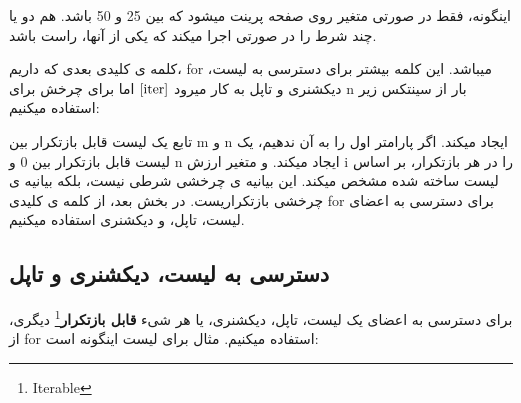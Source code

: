\documentclass[14pt,a4paper]{memoir}
\begin{document}
	 \begin{latin}
	
\end{latin}
	 
	 
	 اینگونه، فقط در صورتی متغیر روی صفحه پرینت میشود که بین 25 و 50 باشد.  هم دو یا چند شرط را در صورتی اجرا میکند که یکی از آنها، راست باشد. 
	 
	 کلمه ی کلیدی بعدی که داریم، for میباشد. این کلمه بیشتر برای دسترسی به لیست، دیکشنری و تاپل به کار میرود \(\ref{iter}\) اما برای چرخش برای n بار از سینتکس زیر استفاده میکنیم:
	 
	 
	 
	 
	 	 
\begin{latin}
	 	
	 \end{latin}
	 
	 
	 
	 تابع   یک لیست قابل بازتکرار بین m و n ایجاد میکند. اگر پارامتر اول را به آن ندهیم، یک لیست قابل بازتکرار بین 0 و n ایجاد میکند. و متغیر ارزش i را در هر بازتکرار، بر اساس لیست ساخته شده مشخص میکند. این بیانیه ی چرخشی شرطی نیست، بلکه بیانیه ی چرخشی بازتکراریست. در بخش بعد، از کلمه ی کلیدی for برای دسترسی به اعضای لیست، تاپل، و دیکشنری استفاده میکنیم.
	 
	 
\subsection{دسترسی به لیست، دیکشنری و تاپل}\label{iter}
	 
	 برای دسترسی به اعضای یک لیست، تاپل، دیکشنری، یا هر شیء \textbf{قابل بازتکرار}\footnote{Iterable} دیگری، از for استفاده میکنیم. مثال برای لیست اینگونه است:
	 
	 \begin{latin}
	 	
	 \end{latin}
	 
\end{document}
